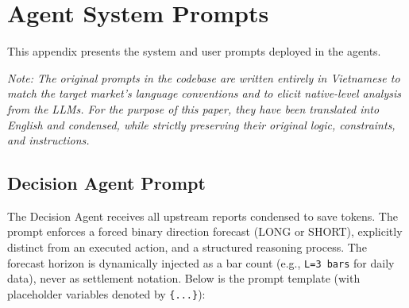\appendix

\section{Agent System Prompts}
\label{app:prompts}

This appendix presents the system and user prompts deployed in the agents.

\textit{Note: The original prompts in the codebase are written entirely in Vietnamese to match the target market's language conventions and to elicit native-level analysis from the LLMs. For the purpose of this paper, they have been translated into English and condensed, while strictly preserving their original logic, constraints, and instructions.}

\subsection{Decision Agent Prompt}
\label{app:prompt_decision}

The Decision Agent receives all upstream reports condensed to save tokens. The prompt enforces a forced binary direction forecast (LONG or SHORT), explicitly distinct from an executed action, and a structured reasoning process. The forecast horizon is dynamically injected as a bar count (e.g., \texttt{L=3 bars} for daily data), never as settlement notation. Below is the prompt template (with placeholder variables denoted by \texttt{\{...\}}):

